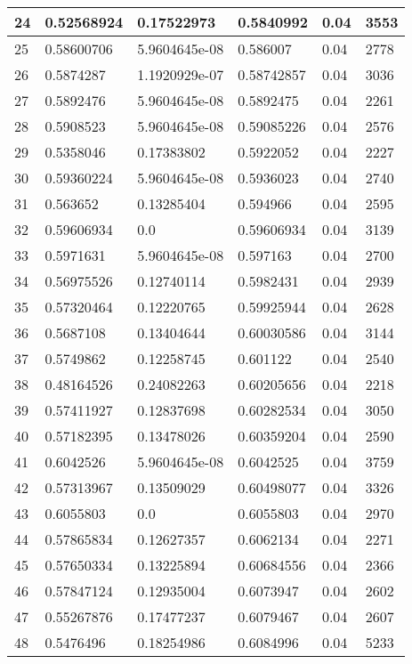 \begin{longtable}{|l|l|l|l|l|l|}
24 & 0.52568924 & 0.17522973 & 0.5840992 & 0.04 & 3553 \\ \hline 
25 & 0.58600706 & 5.9604645e-08 & 0.586007 & 0.04 & 2778 \\ \hline 
26 & 0.5874287 & 1.1920929e-07 & 0.58742857 & 0.04 & 3036 \\ \hline 
27 & 0.5892476 & 5.9604645e-08 & 0.5892475 & 0.04 & 2261 \\ \hline 
28 & 0.5908523 & 5.9604645e-08 & 0.59085226 & 0.04 & 2576 \\ \hline 
29 & 0.5358046 & 0.17383802 & 0.5922052 & 0.04 & 2227 \\ \hline 
30 & 0.59360224 & 5.9604645e-08 & 0.5936023 & 0.04 & 2740 \\ \hline 
31 & 0.563652 & 0.13285404 & 0.594966 & 0.04 & 2595 \\ \hline 
32 & 0.59606934 & 0.0 & 0.59606934 & 0.04 & 3139 \\ \hline 
33 & 0.5971631 & 5.9604645e-08 & 0.597163 & 0.04 & 2700 \\ \hline 
34 & 0.56975526 & 0.12740114 & 0.5982431 & 0.04 & 2939 \\ \hline 
35 & 0.57320464 & 0.12220765 & 0.59925944 & 0.04 & 2628 \\ \hline 
36 & 0.5687108 & 0.13404644 & 0.60030586 & 0.04 & 3144 \\ \hline 
37 & 0.5749862 & 0.12258745 & 0.601122 & 0.04 & 2540 \\ \hline 
38 & 0.48164526 & 0.24082263 & 0.60205656 & 0.04 & 2218 \\ \hline 
39 & 0.57411927 & 0.12837698 & 0.60282534 & 0.04 & 3050 \\ \hline 
40 & 0.57182395 & 0.13478026 & 0.60359204 & 0.04 & 2590 \\ \hline 
41 & 0.6042526 & 5.9604645e-08 & 0.6042525 & 0.04 & 3759 \\ \hline 
42 & 0.57313967 & 0.13509029 & 0.60498077 & 0.04 & 3326 \\ \hline 
43 & 0.6055803 & 0.0 & 0.6055803 & 0.04 & 2970 \\ \hline 
44 & 0.57865834 & 0.12627357 & 0.6062134 & 0.04 & 2271 \\ \hline 
45 & 0.57650334 & 0.13225894 & 0.60684556 & 0.04 & 2366 \\ \hline 
46 & 0.57847124 & 0.12935004 & 0.6073947 & 0.04 & 2602 \\ \hline 
47 & 0.55267876 & 0.17477237 & 0.6079467 & 0.04 & 2607 \\ \hline 
48 & 0.5476496 & 0.18254986 & 0.6084996 & 0.04 & 5233 \\ \hline 

\end{longtable}
